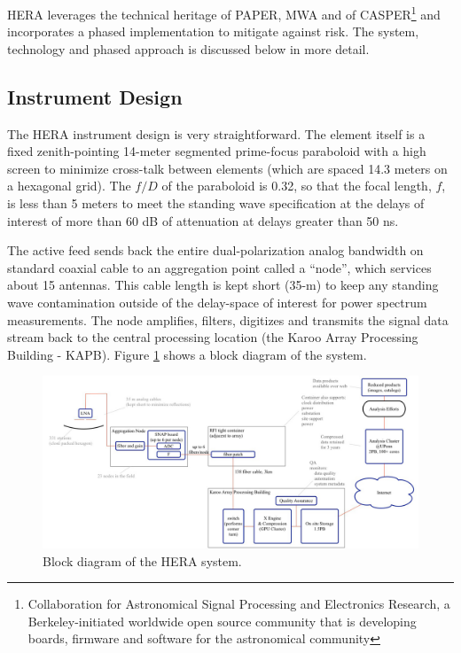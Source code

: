 \documentclass[preprint]{aastex}
\begin{document}
HERA leverages the technical heritage of PAPER, MWA and of CASPER\footnote{Collaboration for Astronomical
Signal Processing and Electronics Research, a Berkeley-initiated worldwide open source community that is
developing boards, firmware and software for the astronomical community} and incorporates a
phased implementation to mitigate against risk.  The system, technology and phased approach is discussed below
in more detail.

\vspace{-0.25in}
\subsection{Instrument Design}
\vspace{-6pt}
\label{InstDes}
The HERA instrument design is very straightforward.  The element
itself is a fixed zenith-pointing 14-meter segmented prime-focus paraboloid with a high screen
to minimize cross-talk between elements (which are spaced 14.3 meters on a
hexagonal grid).   The $f/D$ of
the paraboloid is 0.32, so that the focal length, $f$, is less than 5 meters to meet the 
standing wave specification at the delays of interest of more than 60 dB of attenuation at delays 
greater than 50 ns.


The active feed sends back the entire dual-polarization analog bandwidth on standard
coaxial cable to an aggregation point called a ``node'', which services 
about 15 antennas.  This cable length is kept short (35-m) to keep any standing
wave contamination outside of the delay-space of interest for power spectrum
measurements.  The node amplifies, filters, digitizes and transmits the signal data stream
back to the central processing location (the Karoo Array Processing Building - KAPB).
Figure \ref{fig:blockDiagram} shows a block diagram of the system.

\begin{figure}[h]
\centering
\includegraphics[width=\textwidth]{plots/Engineering/HERA_high_level_block_diagram.jpg}
\caption{Block diagram of the HERA system.}
\label{fig:blockDiagram} 
\end{figure}
\end{document}
